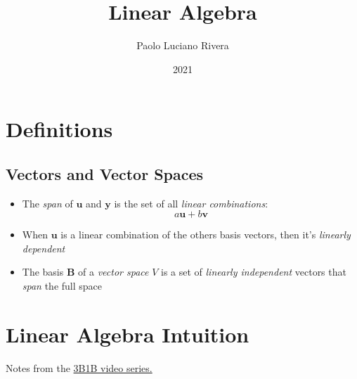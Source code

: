 \documentclass[pdftex,11pt,a4paper]{article}
\title{Linear Algebra}
\author{Paolo Luciano Rivera}
\date{2021}
\newcommand{\B}{\mathbf{B}}
\newcommand{\yn}{\mathbf{y}}
\newcommand{\un}{\mathbf{u}}
\newcommand{\vn}{\mathbf{v}}
\begin{document}
\maketitle

\section{Definitions}
\subsection{Vectors and Vector Spaces}
\begin{itemize}
	\item The \textit{span} of $\un$ and $\yn$ is the set of all \textit{linear combinations}:
	$$a \un + b \vn$$ 
	\item When $\un$ is a linear combination of the others basis vectors, then it's \textit{linearly dependent}
 	\item The basis $\B$ of a \textit{vector space} $V$ is a set of \textit{linearly independent} vectors that \textit{span} the full space
\end{itemize}

\section{Linear Algebra Intuition}
Notes from the \href{https://www.youtube.com/watch?v=fNk_zzaMoSs&list=PLZHQObOWTQDPD3MizzM2xVFitgF8hE_ab}{3B1B video series.}
\end{document}
